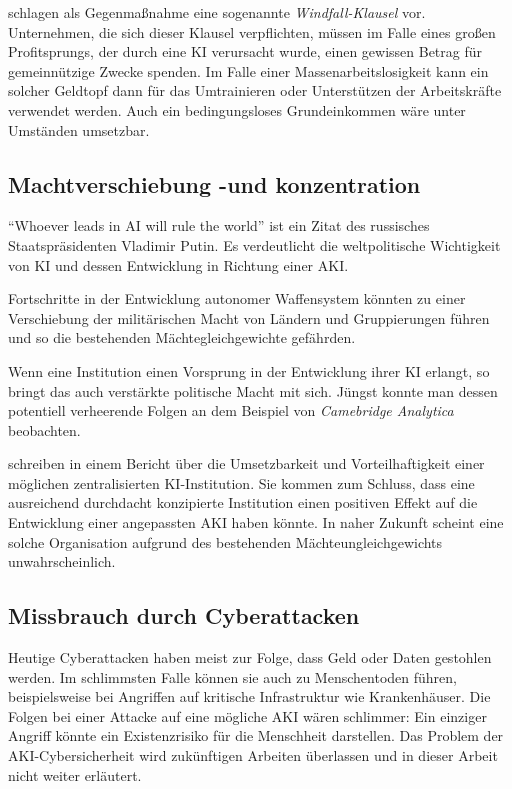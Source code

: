\citeauthor{okeefe_windfall_2020} schlagen als Gegenmaßnahme eine sogenannte \emph{Windfall-Klausel} vor. Unternehmen, die sich dieser Klausel verpflichten, müssen im Falle eines großen Profitsprungs, der durch eine KI verursacht wurde, einen gewissen Betrag für gemeinnützige Zwecke spenden. Im Falle einer Massenarbeitslosigkeit kann ein solcher Geldtopf dann für das Umtrainieren oder Unterstützen der Arbeitskräfte verwendet werden. Auch ein bedingungsloses Grundeinkommen wäre unter Umständen umsetzbar. 

\subsection{Machtverschiebung -und konzentration}
\enquote{Whoever leads in AI will rule the world} ist ein Zitat des russisches Staatspräsidenten Vladimir Putin. Es verdeutlicht die weltpolitische Wichtigkeit von KI und dessen Entwicklung in Richtung einer AKI.

Fortschritte in der Entwicklung autonomer Waffensystem könnten zu einer Verschiebung der militärischen Macht von Ländern und Gruppierungen führen und so die bestehenden Mächtegleichgewichte gefährden.

Wenn eine Institution einen Vorsprung in der Entwicklung ihrer KI erlangt, so bringt das auch verstärkte politische Macht mit sich. Jüngst konnte man dessen potentiell verheerende Folgen an dem Beispiel von \emph{Camebridge Analytica} beobachten. 

\citeauthor{cihon_should_2019} schreiben in einem Bericht über die Umsetzbarkeit und Vorteilhaftigkeit einer möglichen zentralisierten KI-Institution. Sie kommen zum Schluss, dass eine ausreichend durchdacht konzipierte Institution einen positiven Effekt auf die Entwicklung einer angepassten AKI haben könnte. In naher Zukunft scheint eine solche Organisation aufgrund des bestehenden Mächteungleichgewichts unwahrscheinlich. 

\subsection{Missbrauch durch Cyberattacken}
Heutige Cyberattacken haben meist zur Folge, dass Geld oder Daten gestohlen werden. Im schlimmsten Falle können sie auch zu Menschentoden führen, beispielsweise bei Angriffen auf kritische Infrastruktur wie Krankenhäuser. Die Folgen bei einer Attacke auf eine mögliche AKI wären schlimmer: Ein einziger Angriff könnte ein Existenzrisiko für die Menschheit darstellen. Das Problem der AKI-Cybersicherheit wird zukünftigen Arbeiten überlassen und in dieser Arbeit nicht weiter erläutert. 

